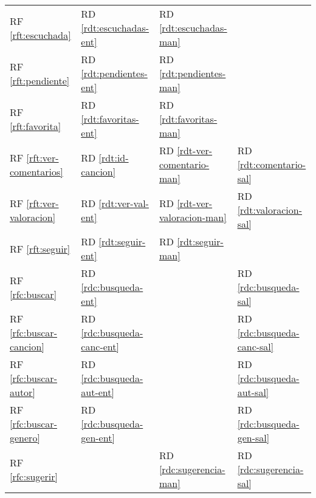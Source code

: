 \begin{tabularx}{\linewidth}{l|XXX}
  RF \ref{rft:escuchada} & RD \ref{rdt:escuchadas-ent} & RD \ref{rdt:escuchadas-man} & \\
  RF \ref{rft:pendiente} & RD \ref{rdt:pendientes-ent} & RD \ref{rdt:pendientes-man} & \\
  RF \ref{rft:favorita} & RD \ref{rdt:favoritas-ent} & RD \ref{rdt:favoritas-man} & \\
  RF \ref{rft:ver-comentarios} & RD \ref{rdt:id-cancion} & RD \ref{rdt-ver-comentario-man} & RD \ref{rdt:comentario-sal}\\
  RF \ref{rft:ver-valoracion} & RD \ref{rdt:ver-val-ent} & RD \ref{rdt-ver-valoracion-man} & RD \ref{rdt:valoracion-sal} \\
  RF \ref{rft:seguir} & RD \ref{rdt:seguir-ent} & RD \ref{rdt:seguir-man} & \\
  RF \ref{rfc:buscar} & RD \ref{rdc:busqueda-ent} & & RD \ref{rdc:busqueda-sal} \\
  RF \ref{rfc:buscar-cancion} & RD \ref{rdc:busqueda-canc-ent} & & RD \ref{rdc:busqueda-canc-sal} \\
  RF \ref{rfc:buscar-autor} & RD \ref{rdc:busqueda-aut-ent} & & RD \ref{rdc:busqueda-aut-sal} \\
  RF \ref{rfc:buscar-genero} & RD \ref{rdc:busqueda-gen-ent} & & RD \ref{rdc:busqueda-gen-sal} \\
  RF \ref{rfc:sugerir} & & RD \ref{rdc:sugerencia-man} & RD \ref{rdc:sugerencia-sal}\\
\end{tabularx}

